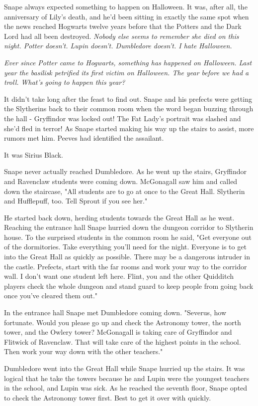 \documentclass[a4paper,11pt]{article}
\begin{document}
Snape always expected something to happen on Halloween. It was, after all, the anniversary of Lily's death, and he'd been sitting in exactly the same spot when the news reached Hogwarts twelve years before that the Potters and the Dark Lord had all been destroyed. \emph{Nobody else seems to remember she died on this night. Potter doesn't. Lupin doesn't. Dumbledore doesn't. I hate Halloween.}

\emph{Ever since Potter came to Hogwarts, something has happened on Halloween. Last year the basilisk petrified its first victim on Halloween. The year before we had a troll. What's going to happen this year?}

It didn't take long after the feast to find out. Snape and his prefects were getting the Slytherins back to their common room when the word began buzzing through the hall - Gryffindor was locked out! The Fat Lady's portrait was slashed and she'd fled in terror! As Snape started making his way up the stairs to assist, more rumors met him. Peeves had identified the assailant.

It was Sirius Black.

Snape never actually reached Dumbledore. As he went up the stairs, Gryffindor and Ravenclaw students were coming down. McGonagall saw him and called down the staircase, "All students are to go at once to the Great Hall. Slytherin and Hufflepuff, too. Tell Sprout if you see her."

He started back down, herding students towards the Great Hall as he went. Reaching the entrance hall Snape hurried down the dungeon corridor to Slytherin house. To the surprised students in the common room he said, "Get everyone out of the dormitories. Take everything you'll need for the night. Everyone is to get into the Great Hall as quickly as possible. There may be a dangerous intruder in the castle. Prefects, start with the far rooms and work your way to the corridor wall. I don't want one student left here. Flint, you and the other Quidditch players check the whole dungeon and stand guard to keep people from going back once you've cleared them out."

In the entrance hall Snape met Dumbledore coming down. "Severus, how fortunate. Would you please go up and check the Astronomy tower, the north tower, and the Owlery tower? McGonagall is taking care of Gryffindor and Flitwick of Ravenclaw. That will take care of the highest points in the school. Then work your way down with the other teachers."

Dumbledore went into the Great Hall while Snape hurried up the stairs. It was logical that he take the towers because he and Lupin were the youngest teachers in the school, and Lupin was sick. As he reached the seventh floor, Snape opted to check the Astronomy tower first. Best to get it over with quickly.
\end{document}
